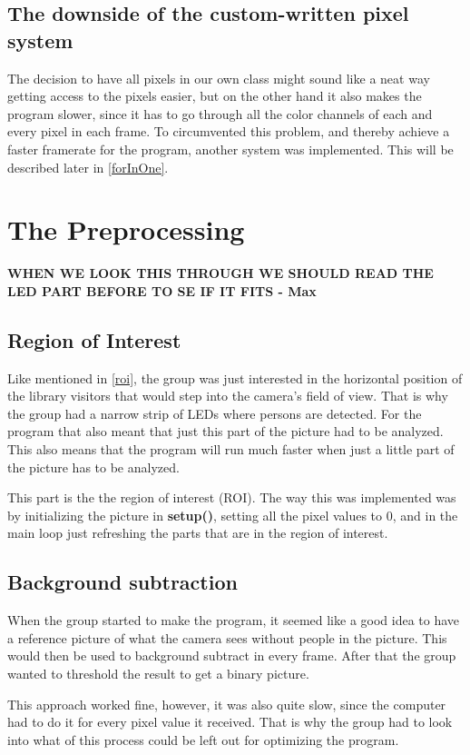 \subsection{The downside of the custom-written pixel system}
The decision to have all pixels in our own class might sound like a neat way getting access to the pixels easier, but on the other hand it also makes the program slower, since it has to go through all the color channels of each and every pixel in each frame. To circumvented this problem, and thereby achieve a faster framerate for the program, another system was implemented. This will be described later in \ref{forInOne}. 

\section{The Preprocessing}
\textbf{WHEN WE LOOK THIS THROUGH WE SHOULD READ THE LED PART BEFORE TO SE IF IT FITS - Max}

\subsection{Region of Interest}
Like mentioned in \ref{roi}, the group was just interested in the horizontal position of the library visitors that would step into the camera's field of view. That is why the group had a narrow strip of LEDs where persons are detected. For the program that also meant that just this part of the picture had to be analyzed. This also means that the program will run much faster when just a little part of the picture has to be analyzed.

This part is the the region of interest (ROI). The way this was implemented was by initializing the picture in \textbf{setup()}, setting all the pixel values to 0, and in the main loop just refreshing the parts that are in the region of interest.
 
\subsection{Background subtraction}
When the group started to make the program, it seemed like a good idea to have a reference picture of what the camera sees without people in the picture. This would then be used to background subtract in every frame. After that the group wanted to threshold the result to get a binary picture. 

This approach worked fine, however, it was also quite slow, since the computer had to do it for every pixel value it received. That is why the group had to look into what of this process could be left out for optimizing the program.

